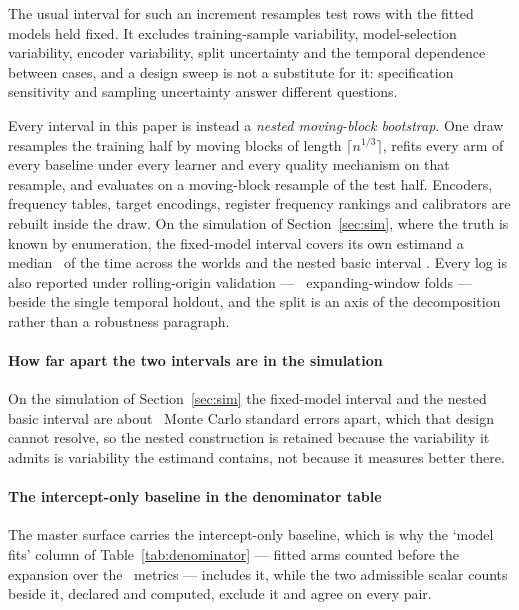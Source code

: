 The usual interval for such an increment resamples test rows with the fitted
models held fixed. It excludes training-sample variability, model-selection
variability, encoder variability, split uncertainty and the temporal
dependence between cases, and a design sweep is not a substitute for it:
specification sensitivity and sampling uncertainty answer different questions.

Every interval in this paper is instead a \emph{nested moving-block
bootstrap}. One draw resamples the training half by moving blocks
\citep{kunsch1989jackknife} of length $\lceil n^{1/3} \rceil$, refits every
arm of every baseline under every learner and every quality mechanism on that
resample, and evaluates on a moving-block resample of the test half. Encoders,
frequency tables, target encodings, register frequency rankings and
calibrators are rebuilt inside the draw. On the simulation of
Section~\ref{sec:sim}, where the truth is known by enumeration, the
fixed-model interval covers its own estimand a median
\coverageNaiveMedian\ of the time across the worlds and the nested basic
interval \coverageNestedBasicMedian. Every log is also reported under
rolling-origin validation --- \nFolds\ expanding-window folds --- beside the
single temporal holdout, and the split is an axis of the decomposition rather
than a robustness paragraph.

\paragraph{How far apart the two intervals are in the simulation}
On the simulation of Section~\ref{sec:sim} the fixed-model interval and the
nested basic interval are about \nestedGainInSe\ Monte Carlo standard errors
apart, which that design cannot resolve, so the nested construction is
retained because the variability it admits is variability the estimand
contains, not because it measures better there.

\paragraph{The intercept-only baseline in the denominator table}
The master surface carries the intercept-only baseline, which is why the
`model fits' column of Table~\ref{tab:denominator} --- fitted arms counted
before the expansion over the \nInstruments\ metrics --- includes it, while
the two admissible scalar counts beside it, declared and computed, exclude it
and agree on every pair.

